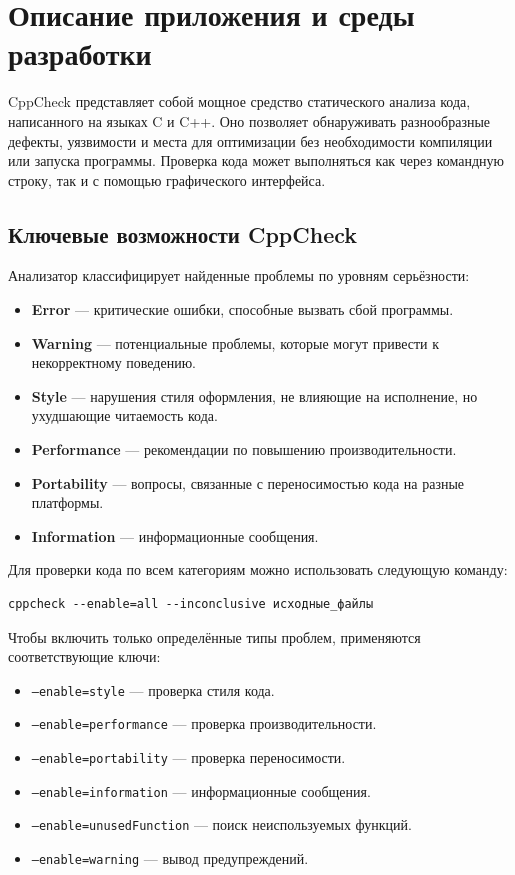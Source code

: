 \documentclass{article}[14pt]
\begin{document}
\pagebreak

\section{Описание приложения и среды разработки}

CppCheck представляет собой мощное средство статического анализа кода, написанного на языках C и C++. Оно позволяет обнаруживать 
разнообразные дефекты, уязвимости и места для оптимизации без необходимости компиляции или запуска программы. Проверка кода может 
выполняться как через командную строку, так и с помощью графического интерфейса.

\subsection*{Ключевые возможности CppCheck}

Анализатор классифицирует найденные проблемы по уровням серьёзности:

\begin{itemize}
\item \textbf{Error} — критические ошибки, способные вызвать сбой программы.
\item \textbf{Warning} — потенциальные проблемы, которые могут привести к некорректному поведению.
\item \textbf{Style} — нарушения стиля оформления, не влияющие на исполнение, но ухудшающие читаемость кода.
\item \textbf{Performance} — рекомендации по повышению производительности.
\item \textbf{Portability} — вопросы, связанные с переносимостью кода на разные платформы.
\item \textbf{Information} — информационные сообщения.
\end{itemize}

Для проверки кода по всем категориям можно использовать следующую команду:

\begin{verbatim}
cppcheck --enable=all --inconclusive исходные_файлы
\end{verbatim}

Чтобы включить только определённые типы проблем, применяются соответствующие ключи:

\begin{itemize}
\item \texttt{--enable=style} — проверка стиля кода.
\item \texttt{--enable=performance} — проверка производительности.
\item \texttt{--enable=portability} — проверка переносимости.
\item \texttt{--enable=information} — информационные сообщения.
\item \texttt{--enable=unusedFunction} — поиск неиспользуемых функций.
\item \texttt{--enable=warning} — вывод предупреждений.
\end{itemize}
\end{document}
